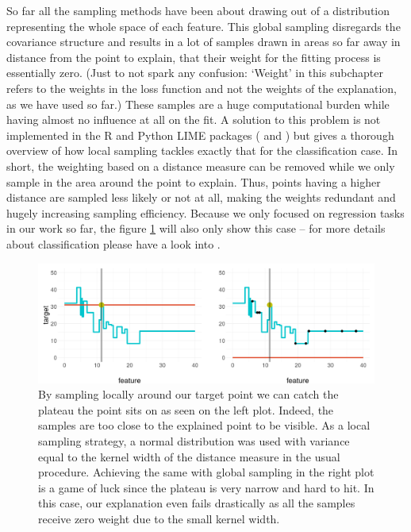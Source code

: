 \documentclass[]{krantz}
\begin{document}
So far all the sampling methods have been about drawing out of a
distribution representing the whole space of each feature. This global
sampling disregards the covariance structure and results in a lot of
samples drawn in areas so far away in distance from the point to
explain, that their weight for the fitting process is essentially zero.
(Just to not spark any confusion: `Weight' in this subchapter refers to
the weights in the loss function and not the weights of the explanation,
as we have used so far.) These samples are a huge computational burden
while having almost no influence at all on the fit. A solution to this
problem is not implemented in the R and Python LIME packages
(\citet{thomasp85lime} and \citet{marcotcrlime}) but
\citet{laugel2018defining} gives a thorough overview of how local
sampling tackles exactly that for the classification case. In short, the
weighting based on a distance measure can be removed while we only
sample in the area around the point to explain. Thus, points having a
higher distance are sampled less likely or not at all, making the
weights redundant and hugely increasing sampling efficiency. Because we
only focused on regression tasks in our work so far, the figure
\ref{fig:figlocalsampling} will also only show this case -- for more
details about classification please have a look into
\citet{laugel2018defining}.

\begin{figure}

{\centering \includegraphics[width=0.99\linewidth]{images/boston_betterVSlime_slim} 

}

\caption{By sampling locally around our target point we can catch the plateau the point sits on as seen on the left plot. Indeed, the samples are too close to the explained point to be visible. As a local sampling strategy, a normal distribution was used with variance equal to the kernel width of the distance measure in the usual procedure. Achieving the same with global sampling in the right plot is a game of luck since the plateau is very narrow and hard to hit. In this case, our explanation even fails drastically as all the samples receive zero weight due to the small kernel width.}\label{fig:figlocalsampling}
\end{figure}
\end{document}
